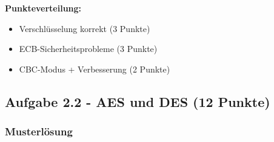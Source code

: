 \documentclass[12pt,a4paper]{article}
\begin{document}
\textbf{Punkteverteilung:}
\begin{itemize}
    \item Verschlüsselung korrekt (3 Punkte) \checkmark
    \item ECB-Sicherheitsprobleme (3 Punkte) \checkmark
    \item CBC-Modus + Verbesserung (2 Punkte) \checkmark
\end{itemize}

\subsection{Aufgabe 2.2 - AES und DES (12 Punkte)}

\subsubsection*{Musterlösung}
\end{document}
